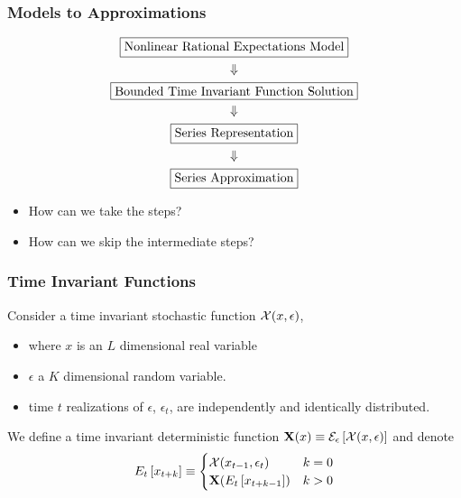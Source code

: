 \documentclass[letter]{beamer}
\begin{document}
\begin{frame}
\frametitle{Models to Approximations }
  \begin{gather}
    \fbox{Nonlinear Rational Expectations Model}\\ \Downarrow\\
\fbox{Bounded Time Invariant Function Solution}\\\Downarrow\\
\fbox{Series Representation}\\\Downarrow\\
\fbox{Series Approximation}
  \end{gather}
  \begin{itemize}
  \item  How can we take the  steps?
  \item  How can we skip the intermediate steps?
  \end{itemize}

\end{frame}
\begin{frame}
  \frametitle{Time Invariant Functions}

Consider a time invariant stochastic function $\mathcal{X}(x,\epsilon)$, 
\begin{itemize}
\item where $x$ is an $L$ dimensional real variable
\item $\epsilon$ a $K$ dimensional random variable.
\item time $t$ realizations of $\epsilon$, $\epsilon_t$, are independently and identically distributed.
\end{itemize}
We define a time invariant deterministic function $\mathbf{X}(x)\equiv \mathcal{E}_{\epsilon} \left [\mathcal{X}(x,\epsilon) \right ]$ and denote
\begin{gather*}
E_{t} \left [x_{t+k} \right ]\equiv\begin{cases}
\mathcal{X}{(x_{t-1},\epsilon_t)} &k=0\\
\mathbf{X}{(E_{t} \left [x_{t+k-1} \right ])} &k>0
\end{cases}
\end{gather*}

\end{frame}
\end{document}
